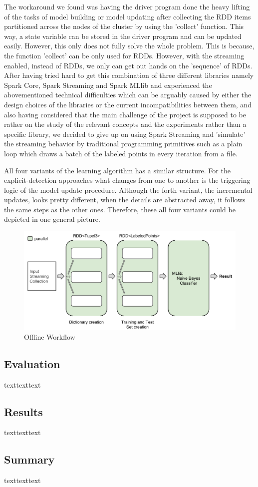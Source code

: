 \documentclass[12pt]{article}
\begin{document}
The workaround we found was having the driver program done the heavy lifting of the tasks of model building or model updating after collecting the RDD items partitioned across the nodes of the cluster by using the 'collect' function. This way, a state variable can be stored in the driver program and can be updated easily. However, this only does not fully solve the whole problem. This is because, the function 'collect' can be only used for RDDs. However, with the streaming enabled, instead of RDDs, we only can get out hands on the 'sequence' of RDDs. After having tried hard to get this combination of three different libraries namely Spark Core, Spark Streaming and Spark MLlib and experienced the abovementioned technical difficulties which can be arguably caused by either the design choices of the libraries or the current incompatibilities between them, and also having considered that the main challenge of the project is supposed to be rather on the study of the relevant concepts and the experiments rather than a specific library, we decided to give up on using Spark Streaming and 'simulate' the streaming behavior by traditional programming primitives such as a plain loop which draws a batch of the labeled points in every iteration from a file.

All four variants of the learning algorithm has a similar structure. For the explicit-detection approaches what changes from one to another is the triggering logic of the model update procedure. Although the forth variant, the incremental updates, looks pretty different, when the details are abstracted away, it follows the same steps as the other ones. Therefore, these all four variants could be depicted in one general picture.



\begin{figure}[htbp]
  \centering
  \includegraphics[scale=0.56]{VisualisationOfflineWorkflow.pdf}
  \caption{Offline Workflow}
\end{figure}

\subsection{Evaluation}
texttexttext

\subsection{Results}
texttexttext

\subsection{Summary}
texttexttext

\newpage
\medskip

\end{document}
